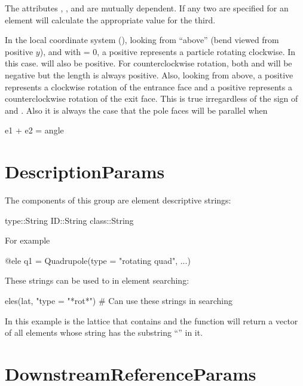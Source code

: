 
The attributes , , and  are mutually dependent. If any two are specified for
an element \accellat will calculate the appropriate value for the third.

In the local coordinate system (), looking from ``above'' (bend viewed from positive
$y$), and with  = 0, a positive  represents a particle rotating clockwise. In
this case.  will also be positive. For counterclockwise rotation, both  and 
will be negative but the length  is always positive. Also, looking from above, a positive
 represents a clockwise rotation of the entrance face and a positive  represents a
counterclockwise rotation of the exit face. This is true irregardless of the sign of  and
. Also it is always the case that the pole faces will be parallel when
\begin{example}
  e1 + e2 = angle
\end{example}

\section{DescriptionParams}
\label{s:descrip.g}

The components of this group are element descriptive strings:
\begin{example}
  type::String 
  ID::String 
  class::String 
\end{example}
 For example
\begin{example}
  @ele q1 = Quadrupole(type = "rotating quad", ...)
\end{example}

These strings can be used to in element searching:
\begin{example}
  eles(lat, "type = "*rot*")     # Can use these strings in searching
\end{example}
In this example  is the lattice that contains  and the  function
will return a vector of all elements whose  string has the substring ``''
in it.

\section{DownstreamReferenceParams}
\label{s:dreference.g}

